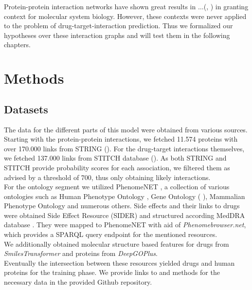 \documentclass{bioinfo}
\renewcommand{\cite}{\citep}
\begin{document}
Protein-protein interaction networks have shown great results in $\dots$(\cite{Vazquez2003}, \cite{Ackerman2019}) in granting context for molecular system biology. However, these contexts were never applied to the problem of drug-target-interaction prediction. Thus we formalized our hypotheses over these interaction graphs and will test them in the following chapters.

\enlargethispage{12pt}

\section{Methods}
\subsection{Datasets}
The data for the different parts of this model were obtained from various sources. Starting with the protein-protein interactions, we fetched 11.574 proteins with over 170.000 links from STRING (\cite{STRINGv10}). For the drug-target interactions themselves, we fetched 
137.000 links from STITCH database (\cite{STITCHv5}). As both STRING and STITCH provide probability scores for each association, we filtered them as advised by a threshold of 700, thus only obtaining likely interactions.\\
For the ontology segment we utilized PhenomeNET \citep{PhenomeNET2011}, a collection of various ontologies such as Human Phenotype Ontology \citep{HPO2018}, Gene Ontology (\citet{GOoriginal2000} \citet{GOrecent2020}), Mammalian Phenotype Ontology \citep{MP2009} and numerous others. 
Side effects and their links to drugs were obtained Side Effect Resource (SIDER)\citep{SIDER} and structured according MedDRA database \citep{MedDRA}. They were mapped to PhenomeNET with aid of \textit{Phenomebrowser.net}, which provides a SPARQL query endpoint for the mentioned resources. \\

We additionally obtained molecular structure based features for drugs from \textit{SmilesTransformer}\citep{SmilesTransformer} and proteins from \textit{DeepGOPlus}\citep{DeepGoPlus}.\\
 
Eventually the intersection between these resources yielded  drugs and  human proteins for the training phase. We provide links to and methods for the necessary data in the provided Github repository.\\
\end{document}
